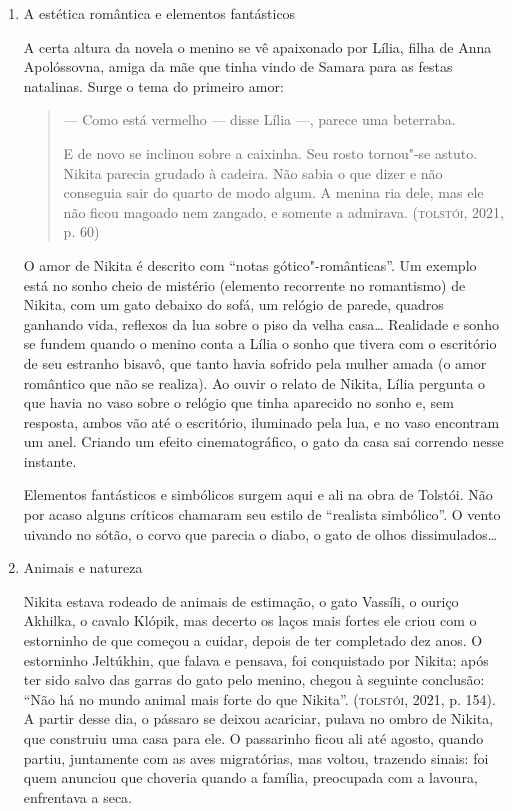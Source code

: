 \documentclass[11pt]{extarticle}
\begin{document}
\begin{enumerate}
\item
A estética romântica e elementos fantásticos

A certa altura da novela o menino se vê apaixonado por Lília, filha de
Anna Apolóssovna, amiga da mãe que tinha vindo de Samara para as festas
natalinas. Surge o tema do primeiro amor:

\begin{quote}
--- Como está vermelho --- disse Lília ---, parece uma beterraba.

E de novo se inclinou sobre a caixinha. Seu rosto tornou"-se astuto.
Nikita parecia grudado à cadeira. Não sabia o que dizer e não conseguia
sair do quarto de modo algum. A menina ria dele, mas ele não ficou
magoado nem zangado, e somente a admirava. (\textsc{tolstói}, 2021, p. 60)
\end{quote}

O amor de Nikita é descrito com ``notas gótico"-românticas''. Um
exemplo está no sonho cheio de mistério (elemento recorrente no
romantismo) de Nikita, com um gato debaixo do sofá, um relógio de
parede, quadros ganhando vida, reflexos da lua sobre o piso da velha
casa\ldots{} Realidade e sonho se fundem quando o menino conta a Lília o
sonho que tivera com o escritório de seu estranho bisavô, que tanto
havia sofrido pela mulher amada (o amor romântico que não se realiza).
Ao ouvir o relato de Nikita, Lília pergunta o que havia no vaso sobre o
relógio que tinha aparecido no sonho e, sem resposta, ambos vão até o
escritório, iluminado pela lua, e no vaso encontram um anel. Criando um
efeito cinematográfico, o gato da casa sai correndo nesse instante.

Elementos fantásticos e simbólicos surgem aqui e ali na obra de
Tolstói. Não por acaso alguns críticos chamaram seu estilo de ``realista
simbólico''. O vento uivando no sótão, o corvo que parecia o diabo, o
gato de olhos dissimulados\ldots{}


\item
Animais e natureza

Nikita estava rodeado de animais de estimação, o gato Vassíli, o
ouriço Akhilka, o cavalo Klópik, mas decerto os laços mais fortes ele
criou com o estorninho de que começou a cuidar, depois de ter completado
dez anos. O estorninho Jeltúkhin, que falava e pensava, foi conquistado
por Nikita; após ter sido salvo das garras do gato pelo menino, chegou à
seguinte conclusão: ``Não há no mundo animal mais forte do que Nikita''.
(\textsc{tolstói}, 2021, p. 154). A partir desse dia, o pássaro se deixou
acariciar, pulava no ombro de Nikita, que construiu uma casa para ele. O
passarinho ficou ali até agosto, quando partiu, juntamente com as aves
migratórias, mas voltou, trazendo sinais: foi quem anunciou que choveria
quando a família, preocupada com a lavoura, enfrentava a seca.


\end{enumerate}
\end{document}
